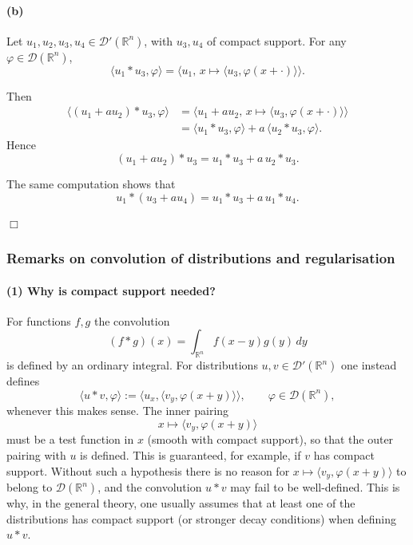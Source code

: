 \documentclass[12pt,a4paper]{article}
\theoremstyle{plain}
\theoremstyle{definition}
\theoremstyle{remark}
\theoremstyle{remark}
\begin{document}
\paragraph{(b)}
Let $u_1,u_2,u_3,u_4 \in \mathcal{D}'(\mathbb{R}^n)$, with $u_3,u_4$ of compact support.
For any $\varphi \in \mathcal{D}(\mathbb{R}^n)$,
\[
\langle u_1*u_3 , \varphi \rangle
= \Big\langle u_1,\, x \mapsto \langle u_3, \varphi(x+\cdot)\rangle \Big\rangle.
\]

Then
\[
\begin{aligned}
	\langle (u_1 + a u_2)*u_3 , \varphi \rangle
	&= \Big\langle u_1 + a u_2,\,
	x \mapsto \langle u_3, \varphi(x+\cdot)\rangle \Big\rangle \\[1mm]
	&= \langle u_1*u_3 , \varphi \rangle
	+ a\,\langle u_2*u_3 , \varphi \rangle.
\end{aligned}
\]
Hence
\[
(u_1 + a u_2)*u_3 = u_1*u_3 + a\,u_2*u_3.
\]

The same computation shows that
\[
u_1*(u_3 + a u_4)
= u_1*u_3 + a\,u_1*u_4.
\]

\hfill$\Box$

\subsubsection*{Remarks on convolution of distributions and regularisation}

\paragraph{(1) Why is compact support needed?}
For functions $f,g$ the convolution
\[
(f*g)(x) = \int_{\mathbb{R}^n} f(x-y)g(y)\,dy
\]
is defined by an ordinary integral. For distributions $u,v\in\mathcal{D}'(\mathbb{R}^n)$
one instead defines
\[
\langle u*v,\varphi\rangle
:= \big\langle u_x, \big\langle v_y,\varphi(x+y)\big\rangle\big\rangle,
\qquad \varphi\in\mathcal{D}(\mathbb{R}^n),
\]
whenever this makes sense. The inner pairing
\[
x \longmapsto \big\langle v_y,\varphi(x+y)\big\rangle
\]
must be a test function in $x$ (smooth with compact support), so that
the outer pairing with $u$ is defined. This is guaranteed, for example,
if $v$ has compact support. Without such a hypothesis there is no reason
for $x\mapsto\langle v_y,\varphi(x+y)\rangle$ to belong to
$\mathcal{D}(\mathbb{R}^n)$, and the convolution $u*v$ may fail to be
well-defined. This is why, in the general theory, one usually assumes
that at least one of the distributions has compact support (or stronger
decay conditions) when defining $u*v$.
\end{document}
